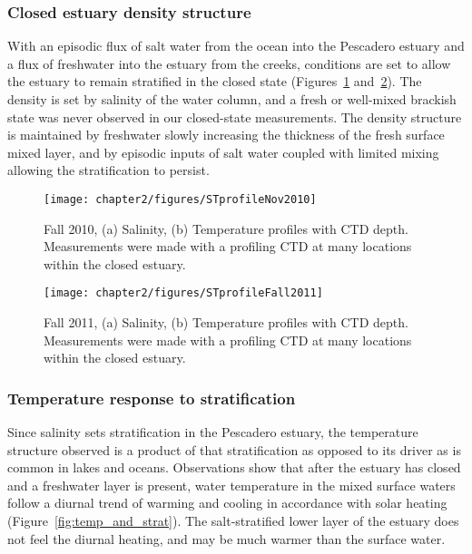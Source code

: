 \subsubsection{Closed estuary density structure} \label{cl_strat}

With an episodic flux of salt water from the ocean into the Pescadero estuary and a flux of freshwater into the estuary from the creeks, conditions are set to allow the estuary to remain stratified in the closed state (Figures~\ref{fig:profNov2010} and~\ref{fig:profFall2011}). The density is set by salinity of the water column, and a fresh or well-mixed brackish state was never observed in our closed-state measurements. The density structure is maintained by freshwater slowly increasing the thickness of the fresh surface mixed layer, and by episodic inputs of salt water coupled with limited mixing allowing the stratification to persist. 


\begin{figure}
\centering
	\texttt{[image: chapter2/figures/STprofileNov2010]}
	\caption{Fall 2010, (a) Salinity, (b) Temperature profiles with CTD depth. Measurements were made with a profiling CTD at many locations within the closed estuary.}
	\label{fig:profNov2010}
\end{figure}


\begin{figure}
\centering
	\texttt{[image: chapter2/figures/STprofileFall2011]}
	\caption{Fall 2011, (a) Salinity, (b) Temperature profiles with CTD depth. Measurements were made with a profiling CTD at many locations within the closed estuary.}
\label{fig:profFall2011}
\end{figure}

\subsubsection{Temperature response to stratification} \label{sssec:TempResStrat}

Since salinity sets stratification in the Pescadero estuary, the temperature structure observed is a product of that stratification as opposed to its driver as is common in lakes and oceans. Observations show that after the estuary has closed and a freshwater layer is present, water temperature in the mixed surface waters follow a diurnal trend of warming and cooling in accordance with solar heating (Figure~\ref{fig:temp_and_strat}). The salt-stratified lower layer of the estuary does not feel the diurnal heating, and may be much warmer than the surface water. 

